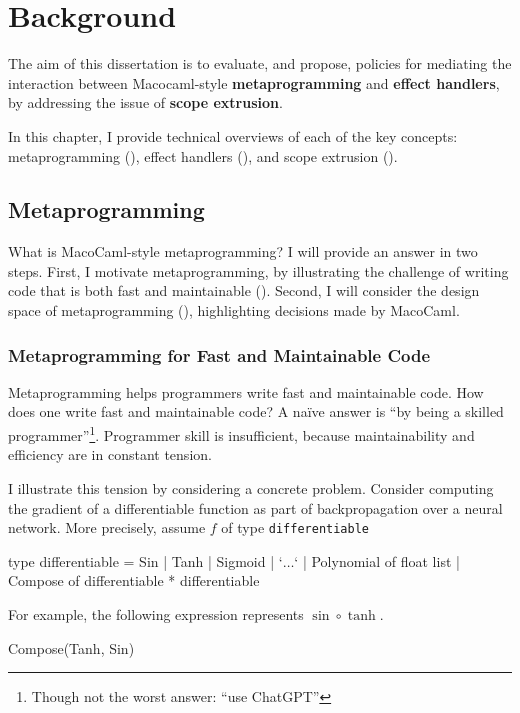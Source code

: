 \chapter{Background}
The aim of this dissertation is to evaluate, and propose, policies for mediating the interaction between Macocaml-style \textbf{metaprogramming} and \textbf{effect handlers}, by addressing the issue of \textbf{scope extrusion}.

In this chapter, I provide technical overviews of each of the key concepts: metaprogramming (), effect handlers (), and scope extrusion ().

\section{Metaprogramming}\label{section:metaprogramming-technical}
What is MacoCaml-style metaprogramming? I will provide an answer in two steps. First, I motivate metaprogramming, by illustrating the challenge of writing code that is both fast and maintainable (). Second, I will consider the design space of metaprogramming (), highlighting decisions made by MacoCaml.

\subsection{Metaprogramming for Fast and Maintainable Code}\label{subsection:metaprogramming-motivation}

Metaprogramming helps programmers write fast and maintainable code. How does one write fast and maintainable code? A naïve answer is ``by being a skilled programmer''\footnote{Though not the worst answer: ``use ChatGPT''}. Programmer skill is insufficient, because maintainability and efficiency are in constant tension. 

I illustrate this tension by considering a concrete problem. Consider computing the gradient of a differentiable function as part of backpropagation over a neural network. More precisely, assume $f$ of type \texttt{differentiable}

\begin{ocaml}
type differentiable = Sin | Tanh | Sigmoid | `$\ldots$`
                    | Polynomial of float list
                    | Compose of differentiable * differentiable
\end{ocaml}
For example, the following expression represents $\sin\circ \tanh$. 
\begin{ocaml}
Compose(Tanh, Sin)
\end{ocaml}

